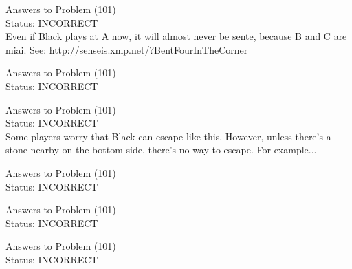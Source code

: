 \documentclass[11pt]{article}
\begin{document}
\begin{minipage}[t]{0.5\textwidth}
  {\centering
  
  Answers to Problem (101)\\
  Status: INCORRECT\\
  Even if Black plays at A now, it will almost never be sente, because B and C are miai. See: http://senseis.xmp.net/?BentFourInTheCorner\\
  }
\end{minipage}
\begin{minipage}[t]{0.5\textwidth}
  {\centering
  
  Answers to Problem (101)\\
  Status: INCORRECT\\
  
  }
\end{minipage}
\begin{minipage}[t]{0.5\textwidth}
  {\centering
  
  Answers to Problem (101)\\
  Status: INCORRECT\\
  Some players worry that Black can escape like this. However, unless there's a stone nearby on the bottom side, there's no way to escape. For example...\\
  }
\end{minipage}
\begin{minipage}[t]{0.5\textwidth}
  {\centering
  
  Answers to Problem (101)\\
  Status: INCORRECT\\
  
  }
\end{minipage}
\begin{minipage}[t]{0.5\textwidth}
  {\centering
  
  Answers to Problem (101)\\
  Status: INCORRECT\\
  
  }
\end{minipage}
\begin{minipage}[t]{0.5\textwidth}
  {\centering
  
  Answers to Problem (101)\\
  Status: INCORRECT\\
  
  }
\end{minipage}
\end{document}
